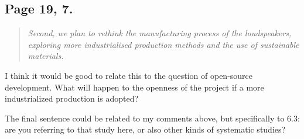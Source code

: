 \documentclass[11pt]{article}
\begin{document}
\subsection*{Page 19, 7.}
\label{sec:org15d056e}
\begin{quote}
\emph{Second, we plan to rethink the
manufacturing process of the loudspeakers, exploring more industrialised production
methods and the use of sustainable materials.}
\end{quote}

I think it would be good to relate this to the question of open-source development. What will happen to the openness of the project if a more industrialized production is adopted?

The final sentence could be related to my comments above, but specifically to 6.3: are you referring to that study here, or also other kinds of systematic studies?
\end{document}
